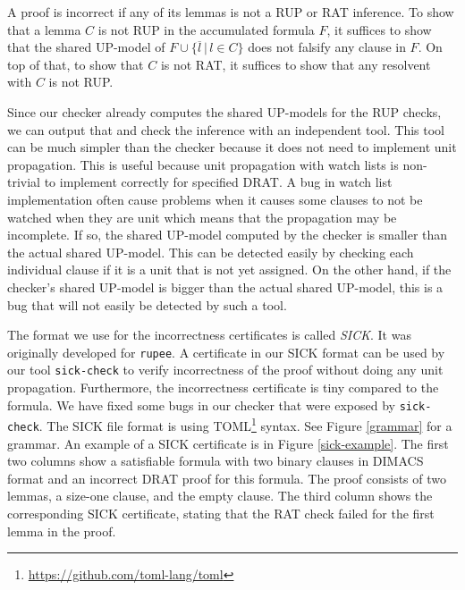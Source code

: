 \documentclass[
]{report}
\begin{document}
A proof is incorrect if any of its lemmas is not a RUP or RAT inference.
To show that a lemma \(C\) is not RUP in the accumulated formula \(F\),
it suffices to show that the shared UP-model of
\(F \cup \{ \overline{l} \,|\, l \in C \}\) does not falsify any clause
in \(F\). On top of that, to show that \(C\) is not RAT, it suffices to
show that any resolvent with \(C\) is not RUP.

Since our checker already computes the shared UP-models for the RUP
checks, we can output that and check the inference with an independent
tool. This tool can be much simpler than the checker because it does not
need to implement unit propagation. This is useful because unit
propagation with watch lists is non-trivial to implement correctly for
specified DRAT. A bug in watch list implementation often cause problems
when it causes some clauses to not be watched when they are unit which
means that the propagation may be incomplete. If so, the shared UP-model
computed by the checker is smaller than the actual shared UP-model. This
can be detected easily by checking each individual clause if it is a
unit that is not yet assigned. On the other hand, if the checker's
shared UP-model is bigger than the actual shared UP-model, this is a bug
that will not easily be detected by such a tool.

The format we use for the incorrectness certificates is called
\emph{SICK}. It was originally developed for \texttt{rupee}. A
certificate in our SICK format can be used by our tool
\texttt{sick-check} to verify incorrectness of the proof without doing
any unit propagation. Furthermore, the incorrectness certificate is tiny
compared to the formula. We have fixed some bugs in our checker that
were exposed by \texttt{sick-check}. The SICK file format is using
TOML\footnote{\url{https://github.com/toml-lang/toml}} syntax. See
Figure \ref{grammar} for a grammar. An example of a SICK certificate is
in Figure \ref{sick-example}. The first two columns show a satisfiable
formula with two binary clauses in DIMACS format and an incorrect DRAT
proof for this formula. The proof consists of two lemmas, a size-one
clause, and the empty clause. The third column shows the corresponding
SICK certificate, stating that the RAT check failed for the first lemma
in the proof.
\end{document}
